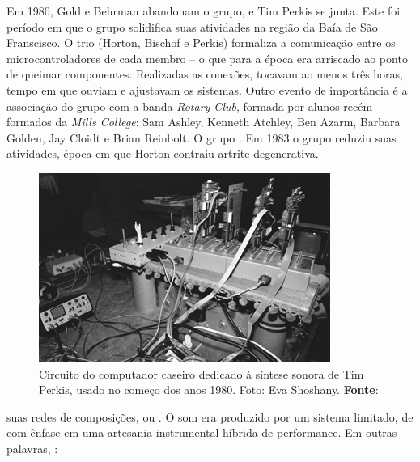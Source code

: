 Em 1980, Gold e Behrman abandonam o grupo, e Tim Perkis se junta. Este foi período em que o grupo solidifica suas atividades na região da Baía de São Franscisco. O trio (Horton, Bischof e Perkis) formaliza a comunicação entre os microcontroladores de cada membro  -- o que para a época era arriscado ao ponto de queimar componentes. Realizadas as conexões, tocavam ao menos três horas, tempo em que ouviam e ajustavam os sistemas\cite[7$^o$ parágrafo]{brown_indigenous_2013}. Outro evento de importância é a associação do grupo com a banda \emph{Rotary Club}, formada por alunos recém-formados da \emph{Mills College}: Sam Ashley, Kenneth Atchley, Ben Azarm, Barbara Golden, Jay Cloidt e Brian Reinbolt. O grupo \cite[8$^o$ parágrafo]{brown_indigenous_2013}. Em 1983 o grupo reduziu suas atividades, época em que Horton contraiu artrite degenerativa.

\begin{figure}[!h]
    \centering
    \includegraphics[scale=0.9]{imagens/perkis.jpg}
    \caption{Circuito do computador caseiro dedicado à síntese sonora de Tim Perkis, usado no começo dos anos 1980. Foto: Eva Shoshany\protect\footnotemark. \textbf{Fonte}: }
    \label{fig:perkis}
  \end{figure}


 suas redes de composições, ou  . O som era produzido por um sistema limitado, de  com ênfase em uma artesania instrumental híbrida de performance. Em outras palavras, \cite[22$^o$ parágrafo]{brown_indigenous_2013}: 

